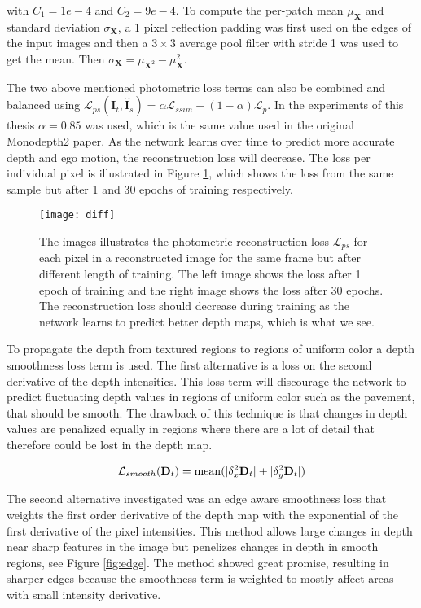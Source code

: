 with $C_1=1e-4$ and $C_2=9e-4$. To compute the per-patch mean $\mu_{\textbf{X}}$ and standard deviation $\sigma_{\textbf{X}}$, a 1 pixel reflection padding was first used on the edges of the input images and then a $3\times3$ average pool filter with stride 1 was used to get the mean. Then $ \sigma_{\textbf{X}}=\mu_{\textbf{X}^2}-\mu_{\textbf{X}}^2 $.

The two above mentioned photometric loss terms can also be combined and balanced using $ \mathcal{L}_{ps}(\textbf{I}_t, \hat{\textbf{I}}_s) = \alpha \mathcal{L}_{ssim} + (1-\alpha) \mathcal{L}_p $. In the experiments of this thesis $\alpha=0.85$ was used, which is the same value used in the original Monodepth2 paper. As the network learns over time to predict more accurate depth and ego motion, the reconstruction loss will decrease. The loss per individual pixel is illustrated in Figure \ref{fig:diff}, which shows the loss from the same sample but after 1 and 30 epochs of training respectively.

\begin{figure}[H]
	\centering
	\texttt{[image: diff]}
	\caption{The images illustrates the photometric reconstruction loss $ \mathcal{L}_{ps} $ for each pixel in a reconstructed image for the same frame but after different length of training. The left image shows the loss after 1 epoch of training and the right image shows the loss after 30 epochs. The reconstruction loss should decrease during training as the network learns to predict better depth maps, which is what we see.}
	\label{fig:diff}
\end{figure}

To propagate the depth from textured regions to regions of uniform color a depth smoothness loss term is used. The first alternative is a loss on the second derivative of the depth intensities. This loss term will discourage the network to predict fluctuating depth values in regions of uniform color such as the pavement, that should be smooth. The drawback of this technique is that changes in depth values are penalized equally in regions where there are a lot of detail that therefore could be lost in the depth map.

\begin{equation}
\mathcal{L}_{smooth}(\textbf{D}_t)=\operatorname{mean}(|\delta_x^2 \textbf{D}_t|+|\delta_y^2 \textbf{D}_t|)
\end{equation}

The second alternative investigated was an edge aware smoothness loss that weights the first order derivative of the depth map with the exponential of the first derivative of the pixel intensities. This method allows large changes in depth near sharp features in the image but penelizes changes in depth in smooth regions, see Figure \ref{fig:edge}. The method showed great promise, resulting in sharper edges because the smoothness term is weighted to mostly affect areas with small intensity derivative.

